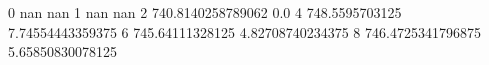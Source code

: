 0 nan nan
1 nan nan
2 740.8140258789062 0.0
4 748.5595703125 7.74554443359375
6 745.64111328125 4.82708740234375
8 746.4725341796875 5.65850830078125
